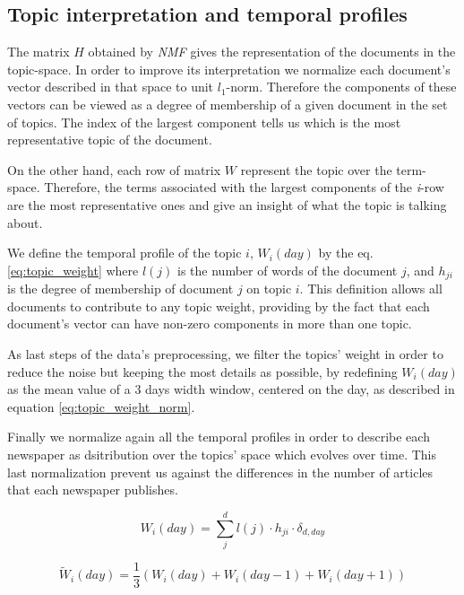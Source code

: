 \subsection{Topic interpretation and temporal profiles}
\par The matrix $H$ obtained by \textit{NMF} gives the representation of the documents in the topic-space. In order to improve its interpretation we normalize each document's vector described in that space to unit $l_1$-norm. Therefore the components of these vectors can be viewed as a degree of membership of a given document in the set of topics. The index of the largest component tells us which is the most representative topic of the document.
\par On the other hand, each row of matrix $W$ represent the topic over the term-space. Therefore, the terms associated with the largest components of the \textit{i}-row are the most representative ones and give an insight of what the topic is talking about.
\par We define the temporal profile of the topic $i$, $W_i(day)$ by the eq. \ref{eq:topic_weight} where $l(j)$ is the number of words of the document $j$, and $h_{ji}$ is the degree of membership of document $j$ on topic $i$. This definition allows all documents to contribute to any topic weight, providing by the fact that each document's vector can have non-zero components in more than one topic.
\par As last steps of the data's preprocessing, we filter the topics' weight in order to reduce the noise but keeping the most details as possible, by redefining $W_i(day)$ as the mean value of a 3 days width window, centered on the day, as described in equation \ref{eq:topic_weight_norm}. 
\par Finally we normalize again all the temporal profiles in order to describe each newspaper as dsitribution over the topics' space which evolves over time. This last normalization prevent us against the differences in the number of articles that each newspaper publishes.

\begin{equation}
W_i(day) = \sum_j^d l(j) \cdot h_{ji} \cdot \delta_{d,day}
\label{eq:topic_weight}
\end{equation}

\begin{equation}
\tilde{W}_i(day) = \frac{1}{3} ({W}_i(day) + {W}_i(day - 1) + W_i(day + 1))
\label{eq:topic_weight_norm}
\end{equation}


